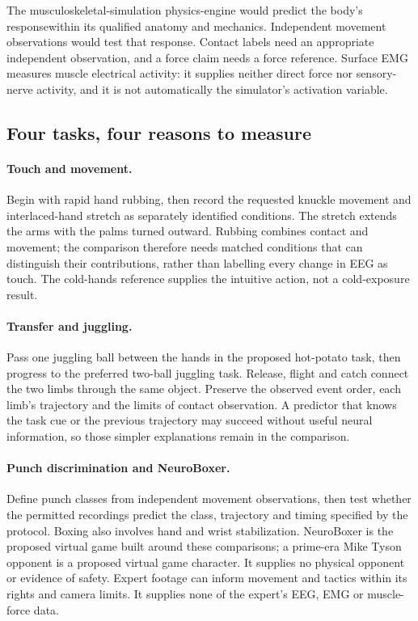 The musculoskeletal-simulation physics-\allowbreak{}engine would predict the body's response\linebreak[4]
within its qualified anatomy and mechanics. Independent movement observations
would test that response. Contact labels need an appropriate independent
observation, and a force claim needs a force reference. Surface EMG measures
muscle electrical activity: it supplies neither direct force nor sensory-nerve
activity, and it is not automatically the simulator's activation variable.

\subsection{Four tasks, four reasons to measure}

\paragraph{Touch and movement.}
Begin with rapid hand rubbing, then record the requested knuckle movement and
interlaced-hand stretch as separately identified conditions. The stretch extends
the arms with the palms turned outward. Rubbing combines contact and movement;
the comparison therefore needs matched conditions that can distinguish their
contributions, rather than labelling every change in EEG as touch. The
cold-hands reference supplies the intuitive action, not a cold-exposure result.

\paragraph{Transfer and juggling.}
Pass one juggling ball between the hands in the proposed hot-potato task, then
progress to the preferred two-ball juggling task. Release, flight and catch
connect the two limbs through the same object. Preserve the observed event
order, each limb's trajectory and the limits of contact observation. A predictor
that knows the task cue or the previous trajectory may succeed without useful
neural information, so those simpler explanations remain in the comparison.

\paragraph{Punch discrimination and NeuroBoxer.}
Define punch classes from independent movement observations, then test whether
the permitted recordings predict the class, trajectory and timing specified by
the protocol. Boxing also involves hand and wrist stabilization. NeuroBoxer is
the proposed virtual game built around these comparisons; a prime-era Mike Tyson
opponent is a proposed virtual game character. It supplies no physical opponent
or evidence of safety. Expert footage can inform movement and tactics within its rights and
camera limits. It supplies none of the expert's EEG, EMG or muscle-force data.

